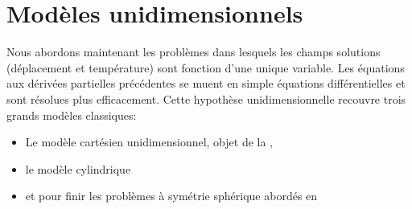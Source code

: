\documentclass[10pt]{book}
\begin{document}
\section{Modèles unidimensionnels}\label{Section:Modèles unidimensionnels}
Nous abordons maintenant les problèmes dans lesquels les champs solutions (déplacement et température) sont fonction d'une unique variable. Les équations aux dérivées partielles précédentes se muent en simple équations différentielles et sont résolues plus efficacement. Cette hypothèse unidimensionnelle recouvre trois grands modèles classiques:
\begin{itemize}
\item Le modèle cartésien unidimensionnel, objet de la , 
\item le modèle cylindrique  
\item et pour finir les problèmes à symétrie sphérique abordés en 
\end{itemize} 
\end{document}
